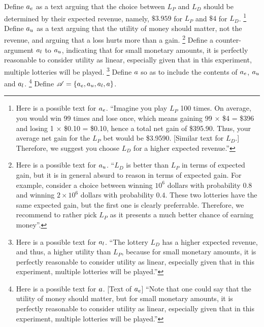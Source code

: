 \documentclass[version=last, pagesize, twoside=off, bibliography=totoc, DIV=calc, fontsize=12pt, a4paper, french, english]{scrartcl}
\begin{document}
\begin{example}
    Define $\ar_e$ as a text arguing that the choice between $L_P$ and $L_D$ should be determined by their expected revenue, namely, $\$3.959$ for $L_P$ and $\$4$ for $L_D$.%
    \footnote{Here is a possible text for $\ar_e$. “Imagine you play $L_P$ 100 times. On average, you would win 99 times and lose once, which means gaining 99 × \$4 = \$396 and losing 1 × \$0.10 = \$0.10, hence a total net gain of \$395.90. Thus, your average net gain for the $L_P$ bet would be \$3.9590. [Similar text for $L_D$.] Therefore, we suggest you choose $L_D$ for a higher expected revenue.”}
    Define $\ar_u$ as a text arguing that the utility of money should matter, not the revenue, and arguing that a loss hurts more than a gain.%
    \footnote{Here is a possible text for $\ar_u$. “$L_D$ is better than $L_P$ in terms of expected gain, but it is in general absurd to reason in terms of expected gain. For example, consider a choice between winning $10^6$ dollars with probability $0.8$ and winning $2 × 10^6$ dollars with probability $0.4$. These two lotteries have the same expected gain, but the first one is clearly preferrable. Therefore, we recommend to rather pick $L_P$ as it presents a much better chance of earning money”.}
    Define a counter-argument $\ar_l$ to $\ar_u$, indicating that for small monetary amounts, it is perfectly reasonable to consider utility as linear, especially given that in this experiment, multiple lotteries will be played.%
    \footnote{Here is a possible text for $\ar_l$. “The lottery $L_D$ has a higher expected revenue, and thus, a higher utility than $L_P$, because for small monetary amounts, it is perfectly reasonable to consider utility as linear, especially given that in this experiment, multiple lotteries will be played.”}
    Define $\ar$ so as to include the contents of $\ar_e$, $\ar_u$ and $\ar_l$.%
    \footnote{Here is a possible text for $\ar$. [Text of $\ar_e$] “Note that one could say that the utility of money should matter, but for small monetary amounts, it is perfectly reasonable to consider utility as linear, especially given that in this experiment, multiple lotteries will be played.”}
    Define $\allargs = \set{\ar_e, \ar_u, \ar_l, \ar}$.


\end{example}
\end{document}
